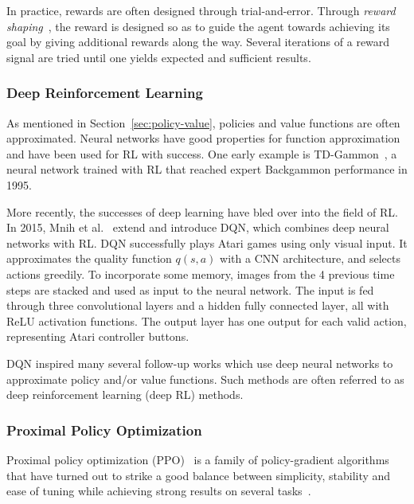In practice, rewards are often designed through trial-and-error.
Through \textit{reward shaping}~\cite{mataric_shaping_1994},
the reward is designed so as to guide the agent towards achieving its goal by giving additional rewards along the way.
Several iterations of a reward signal are tried until one yields expected and sufficient results.

\subsubsection{Deep Reinforcement Learning}

As mentioned in Section~\ref{sec:policy-value}, policies and value functions are often approximated.
Neural networks have good properties for function approximation and have been used for RL with success.
One early example is TD-Gammon~\cite{tesauro1995tdgammon}, a neural network trained with RL that reached expert Backgammon performance in 1995.

More recently, the successes of deep learning have bled over into the field of RL.
In 2015, Mnih et al.~\cite{mnih_human_2015} extend \cite{mnih_atari_2013} and introduce DQN, which combines deep neural networks with RL.
DQN successfully plays Atari games using only visual input.
It approximates the quality function \(q(s, a)\) with a CNN architecture, and selects actions greedily.
To incorporate some memory, images from the 4 previous time steps are stacked and used as input to the neural network.
The input is fed through three convolutional layers and a hidden fully connected layer, all with ReLU activation functions.
The output layer has one output for each valid action, representing Atari controller buttons.

DQN inspired many several follow-up works which use deep neural networks to approximate policy and/or value functions.
Such methods are often referred to as deep reinforcement learning (deep RL) methods.

\subsubsection{Proximal Policy Optimization}
\label{sec:ppo}

Proximal policy optimization (PPO)~\cite{schulman_ppo_2017} is a family of policy-gradient algorithms that have turned out to strike a good balance between simplicity, stability and ease of tuning while achieving strong results on several tasks~\cite{schulman_ppo_2017,henderson_matters_2018,cobbe_procgen_2020,vinyals_alphastar_2019,andrychowicz_empirical_2020}.

